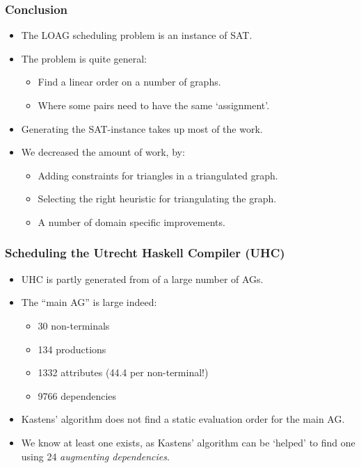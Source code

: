 \documentclass{beamer}
\begin{document}
\begin{frame}
    \frametitle{Conclusion}
    \begin{itemize}
        \item The LOAG scheduling problem is an instance of SAT.
        \item The problem is quite general:
            \begin{itemize}
                \item Find a linear order on a number of graphs.
                \item Where some pairs need to have the same `assignment'.
            \end{itemize}
        \item Generating the SAT-instance takes up most of the work.
        \item We decreased the amount of work, by:
        \begin{itemize}
            \item Adding constraints for triangles in a triangulated graph.
            \item Selecting the right heuristic for triangulating the graph.
            \item A number of domain specific improvements.
        \end{itemize}
    \end{itemize}
\end{frame}

\begin{frame}
    \frametitle{Scheduling the Utrecht Haskell Compiler (UHC)}
    \begin{itemize}
        \item UHC is partly generated from of a large number of AGs.
        \item The ``main AG'' is large indeed:
         \begin{itemize}
            \item 30 non-terminals
            \item 134 productions
            \item 1332 attributes (44.4 per non-terminal!)
            \item 9766 dependencies
         \end{itemize} 
        \item Kastens' algorithm does not find a static evaluation order for the main AG.
        \item We know at least one exists, as Kastens' algorithm can be `helped' to find one
                using 24 \emph{augmenting dependencies}.
    \end{itemize}
\end{frame}
\end{document}
